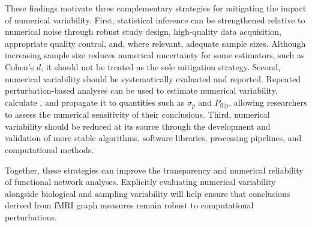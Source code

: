 These findings motivate three complementary strategies for mitigating the
impact of numerical variability. First, statistical inference can be
strengthened relative to numerical noise through robust study design,
high-quality data acquisition, appropriate quality control, and, where
relevant, adequate sample sizes. Although increasing sample size reduces
numerical uncertainty for some estimators, such as Cohen's \(d\), it should not
be treated as the sole mitigation strategy. Second, numerical variability
should be systematically evaluated and reported. Repeated perturbation-based
analyses can be used to estimate numerical variability, calculate
\npvratio{}, and propagate it to quantities such as \(\sigma_p\) and
\(P_{\mathrm{flip}}\), allowing researchers to assess the numerical sensitivity
of their conclusions. Third, numerical variability should be reduced at its
source through the development and validation of more stable algorithms,
software libraries, processing pipelines, and computational methods.

Together, these strategies can improve the transparency and numerical
reliability of functional network analyses. Explicitly evaluating numerical
variability alongside biological and sampling variability will help ensure
that conclusions derived from fMRI graph measures remain robust to
computational perturbations.
